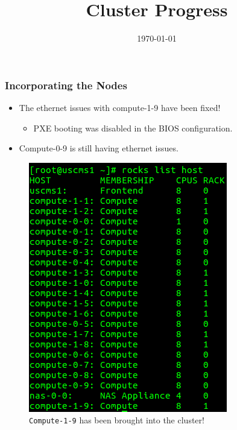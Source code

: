 \documentclass{beamer}
\title{Cluster Progress}
\date{\today}
\begin{document}

\begin{frame}
  \maketitle
\end{frame}



\begin{frame}

  \frametitle{Incorporating the Nodes}
  
  \begin{multicols}{2}

    \begin{itemize}
    \item The ethernet issues with compute-1-9 have been fixed!
      \begin{itemize}
        \item PXE booting was disabled in the BIOS configuration.
      \end{itemize}

    \item Compute-0-9 is still having ethernet issues. 
    \end{itemize}
    
    \columnbreak
    
    \begin{figure}[H]
      \begin{center}
        \includegraphics[scale=0.35]{rockshost_compute19.png}
      \end{center}
      \caption{{\tt Compute-1-9} has been brought into the cluster!}
    \end{figure}
  
  \end{multicols}
  
\end{frame}


\end{document}
